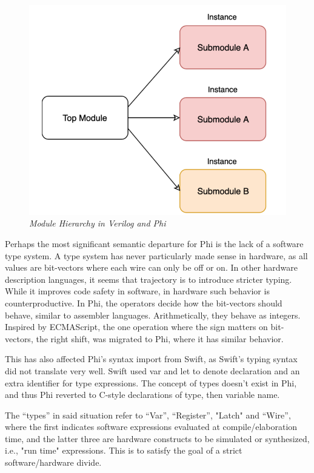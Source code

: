 \documentclass[10pt, two column]{article}
\theoremstyle{definition}
\begin{document}
\begin{figure}
  \includegraphics[width=\linewidth]{module_hierarchy.png}
  \caption{\textit{Module Hierarchy in Verilog and Phi}}
  \label{fig:module_hierarchy}
\end{figure}

Perhaps the most significant semantic departure for Phi is the lack of a software type system. A type system has never particularly made sense in hardware, as all values are bit-vectors where each wire can only be off or on. In other hardware description languages, it seems that trajectory is to introduce stricter typing. While it improves code safety in software, in hardware such behavior is counterproductive. In Phi, the operators decide how the bit-vectors should behave, similar to assembler languages. Arithmetically, they behave as integers. Inspired by ECMAScript\cite{ECMAScript_2018}, the one operation where the sign matters on bit-vectors, the right shift, was migrated to Phi, where it has similar behavior.\par

This has also affected Phi’s syntax import from Swift, as Swift’s typing syntax did not translate very well. Swift used var and let to denote declaration and an extra identifier for type expressions. The concept of types doesn't exist in Phi, and thus Phi reverted to C-style declarations of type, then variable name.\par 

The “types” in said situation refer to “Var”, “Register”, "Latch" and “Wire”, where the first indicates software expressions evaluated at compile/elaboration time, and the latter three are hardware constructs to be simulated or synthesized, i.e., "run time" expressions. This is to satisfy the goal of a strict software/hardware divide.\par
\end{document}

